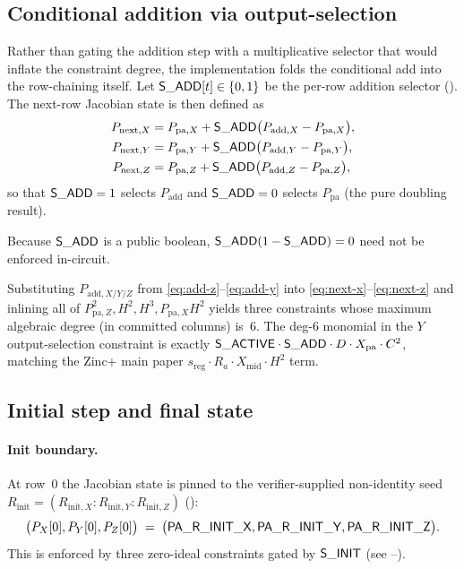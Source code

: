 \subsection{Conditional addition via output-selection}\label{sec:cond-add}

Rather than gating the addition step with a multiplicative selector
that would inflate the constraint degree, the implementation folds
the conditional add into the row-chaining itself. Let
$\mathsf{S\_ADD}[t] \in \{0, 1\}$ be the per-row addition selector
(). The next-row Jacobian state is then defined as
\begin{align}
P_{\mathrm{next},X} &= P_{\mathrm{pa},X} + \mathsf{S\_ADD}\bigl(P_{\mathrm{add},X} - P_{\mathrm{pa},X}\bigr), \label{eq:next-x}\\
P_{\mathrm{next},Y} &= P_{\mathrm{pa},Y} + \mathsf{S\_ADD}\bigl(P_{\mathrm{add},Y} - P_{\mathrm{pa},Y}\bigr), \label{eq:next-y}\\
P_{\mathrm{next},Z} &= P_{\mathrm{pa},Z} + \mathsf{S\_ADD}\bigl(P_{\mathrm{add},Z} - P_{\mathrm{pa},Z}\bigr), \label{eq:next-z}
\end{align}
so that $\mathsf{S\_ADD} = 1$ selects $P_{\mathrm{add}}$ and
$\mathsf{S\_ADD} = 0$ selects $P_{\mathrm{pa}}$ (the pure doubling result).

Because $\mathsf{S\_ADD}$ is a public boolean, $\mathsf{S\_ADD} (1 - \mathsf{S\_ADD}) = 0$
need not be enforced in-circuit.
\begin{remark}
\label{rem:inlined-add}
Substituting $P_{\mathrm{add}, X/Y/Z}$ from
\eqref{eq:add-z}--\eqref{eq:add-y} into \eqref{eq:next-x}--\eqref{eq:next-z}
and inlining all of $P_{\mathrm{pa},Z}^2, H^2, H^3, P_{\mathrm{pa},X} H^2$
yields three constraints whose maximum algebraic degree (in committed
columns) is~$6$. The deg-$6$ monomial in the $Y$ output-selection
constraint is exactly $\mathsf{S\_ACTIVE} \cdot \mathsf{S\_ADD} \cdot D \cdot X_{\mathrm{pa}} \cdot C^2$,
matching the Zinc+ main paper $s_{\mathrm{reg}} \cdot R_a \cdot X_{\mathrm{mid}} \cdot H^2$
term.
\end{remark}

\subsection{Initial step and final state}\label{sec:boundary}

\paragraph{Init boundary.}
At row~$0$ the Jacobian state is pinned to the verifier-supplied
non-identity seed $R_{\mathrm{init}} = (R_{\mathrm{init},X} : R_{\mathrm{init},Y} : R_{\mathrm{init},Z})$
():
$$
\bigl(P_X[0], P_Y[0], P_Z[0]\bigr) \;=\; \bigl(\mathsf{PA\_R\_INIT\_X}, \mathsf{PA\_R\_INIT\_Y}, \mathsf{PA\_R\_INIT\_Z}\bigr).
$$
This is enforced by three zero-ideal constraints gated by
$\mathsf{S\_INIT}$ (see --).

